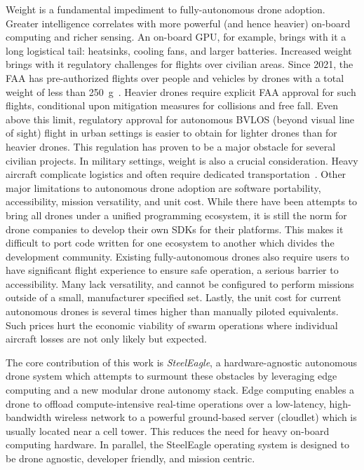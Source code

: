 Weight is a fundamental impediment to fully-autonomous drone adoption. Greater intelligence correlates with more powerful (and hence heavier) on-board computing and richer sensing. An on-board GPU, for example, brings with it a long logistical tail: heatsinks, cooling fans, and larger batteries. Increased weight brings with it regulatory challenges for flights over civilian areas. Since 2021, the FAA has pre-authorized flights over people and vehicles by drones with a total weight of less than 250~g~\cite{FAA2021}. Heavier drones require explicit FAA approval for such flights, conditional upon mitigation measures for collisions and free fall. Even above this limit, regulatory approval for autonomous BVLOS (beyond visual line of sight) flight in urban settings is easier to obtain for lighter drones than for heavier drones. This regulation has proven to be a major obstacle for several civilian projects. In military settings, weight is also a crucial consideration. Heavy aircraft complicate logistics and often require dedicated transportation~\cite{DefensePost}. 
\newpage
Other major limitations to autonomous drone adoption are software portability, accessibility, mission versatility, and unit cost. While there have been attempts to bring all drones under a unified programming ecosystem, it is still the norm for drone companies to develop their own SDKs for their platforms. This makes it difficult to port code written for one ecosystem to another which divides the development community. Existing fully-autonomous drones also require users to have significant flight experience to ensure safe operation, a serious barrier to accessibility. Many lack versatility, and cannot be configured to perform missions outside of a small, manufacturer specified set. Lastly, the unit cost for current autonomous drones is several times higher than manually piloted equivalents. Such prices hurt the economic viability of swarm operations where individual aircraft losses are not only likely but expected.

The core contribution of this work is \textit{SteelEagle}, a hardware-agnostic autonomous drone system which attempts to surmount these obstacles by leveraging edge computing and a new modular drone autonomy stack. Edge computing enables a drone to offload compute-intensive real-time operations over a low-latency, high-bandwidth wireless network to a powerful ground-based server (cloudlet) which is usually located near a cell tower. This reduces the need for heavy on-board computing hardware. In parallel, the SteelEagle operating system is designed to be drone agnostic, developer friendly, and mission centric.


